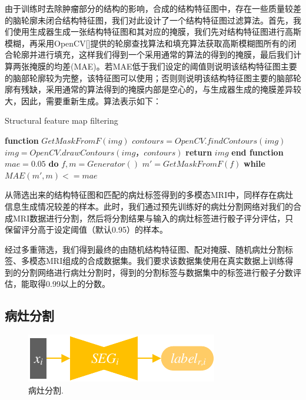 \documentclass[letterpaper]{article} %
\begin{document}
由于训练时去除肿瘤部分的结构的影响，合成的结构特征图中，存在一些质量较差的脑轮廓未闭合结构特征图，我们对此设计了一个结构特征图过滤算法。首先，我们使用生成器生成一张结构特征图和其对应的掩膜，我们先对结构特征图进行高斯模糊\cite{92wink2004denoising}，再采用OpenCV[]提供的轮廓查找算法和填充算法获取高斯模糊图所有的闭合轮廓并进行填充，这样我们得到一个采用通常的算法的得到的掩膜，最后我们计算两张掩膜的均差(MAE)。若MAE低于我们设定的阈值则说明该结构特征图主要的脑部轮廓较为完整，该特征图可以使用；否则则说明该结构特征图主要的脑部轮廓有残缺，采用通常的算法得到的掩膜内部是空心的，与生成器生成的掩膜差异较大，因此，需要重新生成。算法表示如下：
\begin{algorithm}
	\caption{Structural feature map filtering}
	\label{alg:3}
	\begin{algorithmic}[1]
		\State \textbf{function} $GetMaskFromF(img)$
		\State \indent$contours = OpenCV.findContours(img)$
		\State \indent$img =OpenCV.drawContours(img，contours)$
		\State \indent\textbf{return} $img$
		\State \textbf{end function}
		\State
		\State $mae=0.05$
		\State \textbf{do} 
		\State \indent$f, m = Generator()$
		\State \indent$m'= GetMaskFromF(f)$
		\State \textbf{while} $MAE(m',m) <= mae$
	\end{algorithmic}  
\end{algorithm}
%		

从筛选出来的结构特征图和匹配的病灶标签得到的多模态MRI中，同样存在病灶信息生成情况较差的样本。此时，我们通过预先训练好的病灶分割网络对我们的合成MRI数据进行分割，然后将分割结果与输入的病灶标签进行骰子评分评估，只保留评分高于设定阈值（默认0.95）的样本。

经过多重筛选，我们得到最终的由随机结构特征图、配对掩膜、随机病灶分割标签、多模态MRI组成的合成数据集。我们要求该数据集使用在真实数据上训练得到的分割网络进行病灶分割时，得到的分割标签与数据集中的标签进行骰子分数评估，能取得0.99以上的分数。

\subsection{病灶分割}
\begin{figure}
	\centering
	\includegraphics[width=0.98\linewidth]{figures/segmentation}
	\caption{病灶分割.}
	\label{segmentation}
\end{figure}
\end{document}
